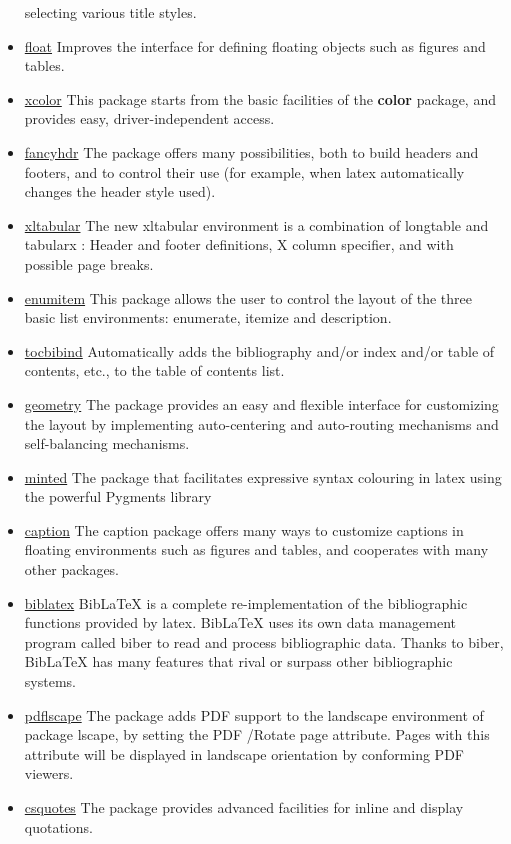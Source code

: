 \begin{itemize}
          selecting various title styles.
    \item \href{https://www.ctan.org/pkg/float}{float} Improves the interface for defining floating
          objects such as figures and tables.
    \item \href{https://www.ctan.org/pkg/xcolor}{xcolor} This package starts from the basic
          facilities of the \textbf{color} package, and provides easy, driver-independent access.
          \label{color}
    \item \href{https://www.ctan.org/pkg/fancyhdr}{fancyhdr} The package offers many possibilities,
          both to build headers and footers, and to control their use (for example, when \gls{latex}
          automatically changes the header style used).
    \item \href{https://www.ctan.org/pkg/xltabular}{xltabular} The new xltabular environment is a
          combination of longtable and tabularx : Header and footer definitions, X column specifier,
          and with possible page breaks.
    \item \href{https://www.ctan.org/pkg/enumitem}{enumitem} This package allows the user to control
          the layout of the three basic list environments: enumerate, itemize and description.
    \item \href{https://www.ctan.org/pkg/tocbibind}{tocbibind} Automatically adds the bibliography
          and/or index and/or table of contents, etc., to the table of contents list.
    \item \href{https://www.ctan.org/pkg/geometry}{geometry} The package provides an easy and
          flexible interface for customizing the layout by implementing auto-centering and
          auto-routing mechanisms and self-balancing mechanisms.
    \item \href{https://www.ctan.org/pkg/minted}{minted} The package that facilitates expressive
          syntax colouring in \gls{latex} using the powerful Pygments library
    \item \href{https://www.ctan.org/pkg/caption}{caption} The caption package offers many ways to
          customize captions in floating environments such as figures and tables, and cooperates
          with many other packages.
    \item \href{https://www.ctan.org/pkg/biblatex}{biblatex} BibLaTeX is a complete
          re-implementation of the bibliographic functions provided by \gls{latex}. BibLaTeX uses
          its own data management program called biber to read and process bibliographic data.
          Thanks to biber, BibLaTeX has many features that rival or surpass other bibliographic
          systems.
    \item \href{https://ctan.org/pkg/pdflscape}{pdflscape} The package adds PDF support to the
          landscape environment of package lscape, by setting the PDF /Rotate page attribute. Pages
          with this attribute will be displayed in landscape orientation by conforming PDF viewers.
    \item \href{https://ctan.org/pkg/csquotes}{csquotes} The package provides advanced facilities
          for inline and display quotations.
\end{itemize}

